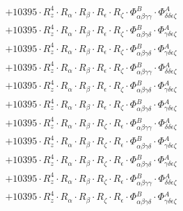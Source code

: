 \documentclass{article}
\begin{document}
\begin{subequations}
\begin{gather}
\begin{array}{c}
 \\[0.2em] 		 + 10395 \cdot R_{z}^{4} \cdot R_{\alpha{}} \cdot R_{\beta{}} \cdot R_{\epsilon{}} \cdot R_{\zeta{}} \cdot \Phi{}^{B}_{\alpha{}\beta{}\gamma{}\gamma{}} \cdot \Phi{}^{A}_{\delta{}\delta{}\epsilon{}\zeta{}} 
 \\[0.2em] 		 + 10395 \cdot R_{z}^{4} \cdot R_{\alpha{}} \cdot R_{\beta{}} \cdot R_{\epsilon{}} \cdot R_{\zeta{}} \cdot \Phi{}^{B}_{\alpha{}\beta{}\gamma{}\delta{}} \cdot \Phi{}^{A}_{\gamma{}\delta{}\epsilon{}\zeta{}} 
 \\[0.2em] 		 + 10395 \cdot R_{z}^{4} \cdot R_{\alpha{}} \cdot R_{\beta{}} \cdot R_{\epsilon{}} \cdot R_{\zeta{}} \cdot \Phi{}^{B}_{\alpha{}\beta{}\gamma{}\delta{}} \cdot \Phi{}^{A}_{\gamma{}\delta{}\epsilon{}\zeta{}} 
 \\[0.2em] 		 + 10395 \cdot R_{z}^{4} \cdot R_{\alpha{}} \cdot R_{\beta{}} \cdot R_{\epsilon{}} \cdot R_{\zeta{}} \cdot \Phi{}^{B}_{\alpha{}\beta{}\gamma{}\gamma{}} \cdot \Phi{}^{A}_{\delta{}\delta{}\epsilon{}\zeta{}} 
 \\[0.2em] 		 + 10395 \cdot R_{z}^{4} \cdot R_{\alpha{}} \cdot R_{\beta{}} \cdot R_{\epsilon{}} \cdot R_{\zeta{}} \cdot \Phi{}^{B}_{\alpha{}\beta{}\gamma{}\delta{}} \cdot \Phi{}^{A}_{\gamma{}\delta{}\epsilon{}\zeta{}} 
 \\[0.2em] 		 + 10395 \cdot R_{z}^{4} \cdot R_{\alpha{}} \cdot R_{\beta{}} \cdot R_{\epsilon{}} \cdot R_{\zeta{}} \cdot \Phi{}^{B}_{\alpha{}\beta{}\gamma{}\delta{}} \cdot \Phi{}^{A}_{\gamma{}\delta{}\epsilon{}\zeta{}} 
 \\[0.2em] 		 + 10395 \cdot R_{z}^{4} \cdot R_{\alpha{}} \cdot R_{\beta{}} \cdot R_{\zeta{}} \cdot R_{\epsilon{}} \cdot \Phi{}^{B}_{\alpha{}\beta{}\gamma{}\gamma{}} \cdot \Phi{}^{A}_{\delta{}\delta{}\epsilon{}\zeta{}} 
 \\[0.2em] 		 + 10395 \cdot R_{z}^{4} \cdot R_{\alpha{}} \cdot R_{\beta{}} \cdot R_{\zeta{}} \cdot R_{\epsilon{}} \cdot \Phi{}^{B}_{\alpha{}\beta{}\gamma{}\delta{}} \cdot \Phi{}^{A}_{\gamma{}\delta{}\epsilon{}\zeta{}} 
 \\[0.2em] 		 + 10395 \cdot R_{z}^{4} \cdot R_{\alpha{}} \cdot R_{\beta{}} \cdot R_{\zeta{}} \cdot R_{\epsilon{}} \cdot \Phi{}^{B}_{\alpha{}\beta{}\gamma{}\delta{}} \cdot \Phi{}^{A}_{\gamma{}\delta{}\epsilon{}\zeta{}} 
 \\[0.2em] 		 + 10395 \cdot R_{z}^{4} \cdot R_{\alpha{}} \cdot R_{\beta{}} \cdot R_{\zeta{}} \cdot R_{\epsilon{}} \cdot \Phi{}^{B}_{\alpha{}\beta{}\gamma{}\gamma{}} \cdot \Phi{}^{A}_{\delta{}\delta{}\epsilon{}\zeta{}} 
 \\[0.2em] 		 + 10395 \cdot R_{z}^{4} \cdot R_{\alpha{}} \cdot R_{\beta{}} \cdot R_{\zeta{}} \cdot R_{\epsilon{}} \cdot \Phi{}^{B}_{\alpha{}\beta{}\gamma{}\delta{}} \cdot \Phi{}^{A}_{\gamma{}\delta{}\epsilon{}\zeta{}} 

\end{array}
\end{gather}
\end{subequations}
\end{document}
